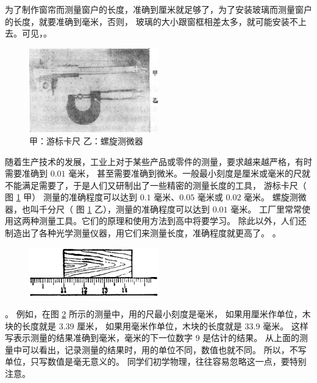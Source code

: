 为了制作窗帘而测量窗户的长度，准确到厘米就足够了，为了安装玻璃而测量窗户的长度，就要准确到毫米，否则，
玻璃的大小跟窗框相差太多，就可能安装不上去。可见，。

\begin{figure}[htbp]
    \centering
    \includegraphics[width=0.5\textwidth]{../pic/czwl1-ch1-2}
    \caption{甲：游标卡尺 \hspace{1em} 乙：螺旋测微器}\label{fig:1-2}
\end{figure}

随着生产技术的发展，工业上对于某些产品或零件的测量，要求越来越严格，有时需要准确到 $0.01$ 毫米，
甚至需要准确到微米。一般最小刻度是厘米或毫米的尺就不能满足需要了，于是人们又研制出了一些精密的测量长度的工具，
游标卡尺（ 图 \ref{fig:1-2} 甲） 测量的准确程度可以达到 $0.1$ 毫米、$0.05$ 毫米或 $0.02$ 毫米。
螺旋测微器，也叫千分尺（ 图 \ref{fig:1-2} 乙），测量的准确程度可以达到 $0.01$ 毫米。
工厂里常常使用这两种测量工具。它们的原理和使用方法到高中将要学习。
除此以外，人们还制造出了各种光学测量仪器，用它们来测量长度，准确程度就更高了。
。

\begin{figure}[htbp]
    \centering
    \includegraphics[width=0.5\textwidth]{../pic/czwl1-ch1-3}
    \caption{}\label{fig:1-3}
\end{figure}

。
例如，在图 \ref{fig:1-3} 所示的测量中，用的尺最小刻度是毫米，
如果用厘米作单位，木块的长度就是 $3.39$ 厘米，
如果用毫米作单位，木块的长度就是 $33.9$ 毫米。
这样写表示测量的结果准确到毫米，毫米的下一位数字 $9$ 是估计的结果。
从上面的测量中可以看出，记录测量的结果时，用的单位不同，数值也就不同。
所以，不写单位，只写数值是毫无意义的。
同学们初学物理，往往容易忽略这一点，要特别注意。

